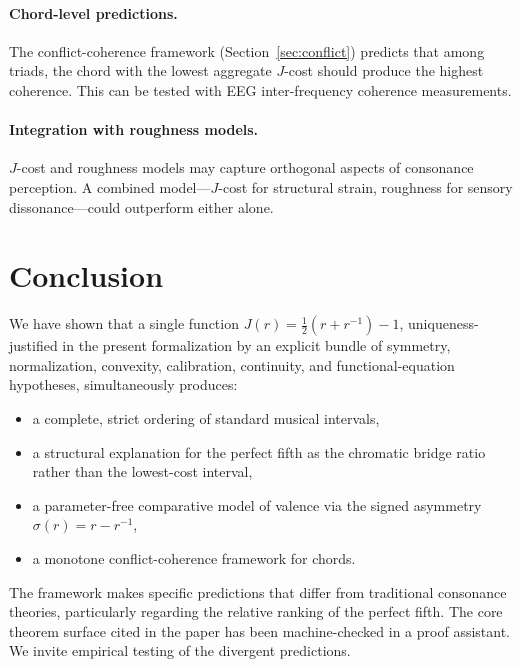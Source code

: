 \documentclass[11pt,a4paper]{article}
\begin{document}
\paragraph{Chord-level predictions.}
The conflict-coherence framework (Section~\ref{sec:conflict}) predicts
that among triads, the chord with the lowest aggregate $J$-cost should
produce the highest coherence.  This can be tested with EEG
inter-frequency coherence measurements.

\paragraph{Integration with roughness models.}
$J$-cost and roughness models may capture orthogonal aspects of
consonance perception.  A combined model---$J$-cost for structural
strain, roughness for sensory dissonance---could outperform either
alone.

\section{Conclusion}
\label{sec:conclusion}

We have shown that a single function $J(r)=\tfrac{1}{2}(r+r^{-1})-1$,
uniqueness-justified in the present formalization by an explicit bundle
of symmetry, normalization, convexity, calibration, continuity, and
functional-equation hypotheses, simultaneously
produces:

\begin{itemize}
  \item a complete, strict ordering of standard musical intervals,
  \item a structural explanation for the perfect fifth as the chromatic
    bridge ratio rather than the lowest-cost interval,
  \item a parameter-free comparative model of valence via the signed
    asymmetry $\sigma(r)=r-r^{-1}$,
  \item a monotone conflict-coherence framework for chords.
\end{itemize}

\noindent The framework makes specific predictions that differ from
traditional consonance theories, particularly regarding the relative
ranking of the perfect fifth.  The core theorem surface cited in the
paper has been machine-checked in a proof assistant.  We invite
empirical testing of the divergent predictions.

\end{document}

